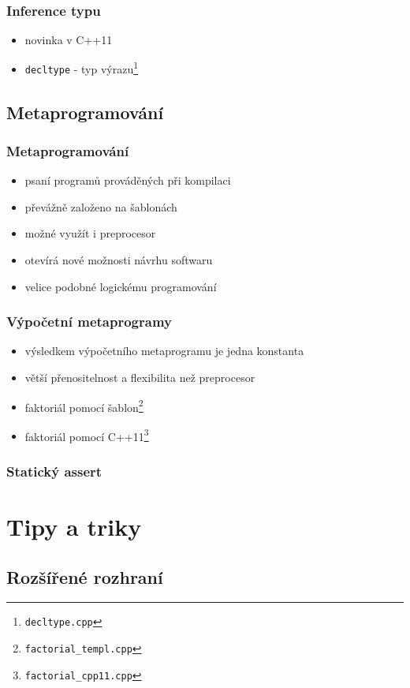\begin{frame} \frametitle{Inference typu}
	\begin{itemize}
		\item{novinka v C++11}
		\item{\texttt{decltype} - typ výrazu\footnote{\texttt{decltype.cpp}}}
	\end{itemize}
\end{frame}

\subsection{Metaprogramování}

\begin{frame} \frametitle{Metaprogramování}
	\begin{itemize}
		\item{psaní programů prováděných při kompilaci}
		\item{převážně založeno na šablonách}
		\item{možné využít i preprocesor}
		\item{otevírá nové možnosti návrhu softwaru}
		\item{velice podobné logickému programování}
	\end{itemize}
\end{frame}

\begin{frame} \frametitle{Výpočetní metaprogramy}
	\begin{itemize}
		\item{výsledkem výpočetního metaprogramu je jedna konstanta}
		\item{větší přenositelnost a flexibilita než preprocesor}
		\item{faktoriál pomocí šablon\footnote{\texttt{factorial\_templ.cpp}}}
		\item{faktoriál pomocí C++11\footnote{\texttt{factorial\_cpp11.cpp}}}
	\end{itemize}
\end{frame}

\begin{frame} \frametitle{Statický assert}
\end{frame}


	\section{Tipy a triky}
	\subsection{Rozšířené rozhraní}

